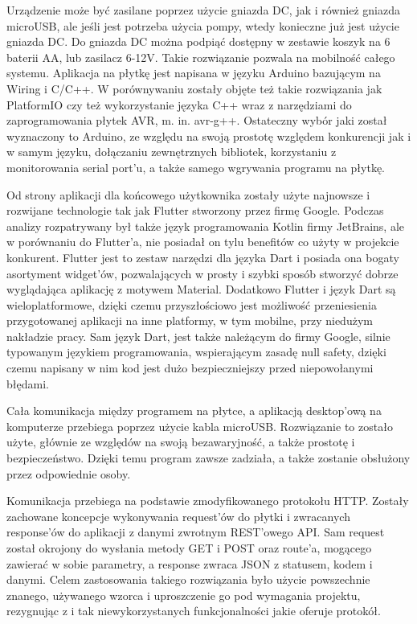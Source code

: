 \documentclass[a4paper,twoside,12pt]{book}
\begin{document}
Urządzenie może być zasilane poprzez użycie gniazda DC, jak i również gniazda microUSB, ale jeśli jest potrzeba użycia pompy, wtedy konieczne już jest użycie gniazda DC. Do gniazda DC można podpiąć dostępny w zestawie koszyk na 6 baterii AA, lub zasilacz 6-12V. Takie rozwiązanie pozwala na mobilność całego systemu.
Aplikacja na płytkę jest napisana w języku Arduino bazującym na Wiring i C/C++. W porównywaniu zostały objęte też takie rozwiązania jak PlatformIO czy też wykorzystanie języka C++ wraz z narzędziami do zaprogramowania płytek AVR, m. in. avr-g++. Ostateczny wybór jaki został wyznaczony to Arduino, ze względu na swoją prostotę względem konkurencji jak i w samym języku, dołączaniu zewnętrznych bibliotek, korzystaniu z monitorowania serial port'u, a także samego wgrywania programu na płytkę.

Od strony aplikacji dla końcowego użytkownika zostały użyte najnowsze i rozwijane technologie tak jak Flutter stworzony przez firmę Google. Podczas analizy rozpatrywany był także język programowania Kotlin firmy JetBrains, ale w porównaniu do Flutter'a, nie posiadał on tylu benefitów co użyty w projekcie konkurent. Flutter jest to zestaw narzędzi dla języka Dart i posiada ona bogaty asortyment widget'ów, pozwalających w prosty i szybki sposób stworzyć dobrze wyglądająca aplikację z motywem Material. Dodatkowo Flutter i język Dart są wieloplatformowe, dzięki czemu przyszłościowo jest możliwość przeniesienia przygotowanej aplikacji na inne platformy, w tym mobilne, przy niedużym nakładzie pracy. Sam język Dart, jest także należącym do firmy Google, silnie typowanym językiem programowania, wspierającym zasadę null safety, dzięki czemu napisany w nim kod jest dużo bezpieczniejszy przed niepowołanymi błędami.

Cała komunikacja między programem na płytce, a aplikacją desktop'ową na komputerze przebiega poprzez użycie kabla microUSB. Rozwiązanie to zostało użyte, głównie ze względów na swoją bezawaryjność, a także prostotę i bezpieczeństwo. Dzięki temu program zawsze zadziała, a także zostanie obsłużony przez odpowiednie osoby.

Komunikacja przebiega na podstawie zmodyfikowanego protokołu HTTP. Zostały zachowane koncepcje wykonywania request'ów do płytki i zwracanych response'ów do aplikacji z danymi zwrotnym REST'owego API. Sam request został okrojony do wysłania metody GET i POST oraz route'a, mogącego zawierać w sobie parametry, a response zwraca JSON z statusem, kodem i danymi. Celem zastosowania takiego rozwiązania było użycie powszechnie znanego, używanego wzorca i uproszczenie go pod wymagania projektu, rezygnując z i tak niewykorzystanych funkcjonalności jakie oferuje protokół.
\end{document}
